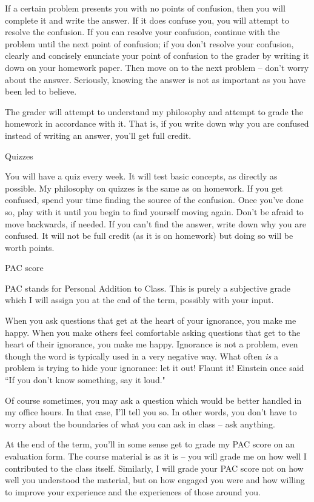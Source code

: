 \documentclass[12pt]{letter}
\begin{document}
If a certain problem presents you with no points of confusion, then you 
will complete it and write the answer.  If it does confuse you, you will 
attempt to resolve the confusion.  If you can resolve your confusion, 
continue with the problem until the next point of confusion; if you don't 
resolve your confusion, clearly and concisely enunciate your point of 
confusion to the grader by writing it down on your homework paper.  Then 
move on to the next problem -- don't worry about the answer.  Seriously, 
knowing the answer is not as important as you have been led to believe.

The grader will attempt to understand my philosophy and attempt to grade 
the homework in accordance with it.  That is, if you write down why you 
are confused instead of writing an answer, you'll get full credit.

\large Quizzes\normalsize 

You will have a quiz every week.  It will test basic concepts, as directly 
as possible.  My philosophy on quizzes is the same as on homework.  If you 
get confused, spend your time finding the source of the confusion.  Once 
you've done so, play with it until you begin to find yourself moving 
again.  Don't be afraid to move backwards, if needed.  If you can't find 
the answer, write down why you are confused.  It will not be full credit 
(as it is on homework) but doing so will be worth points.

\large PAC score\normalsize 

PAC stands for Personal Addition to Class.  This is purely a subjective 
grade which I will assign you at the end of the term, possibly with your 
input.

When you ask questions that get at the heart of your ignorance, you make 
me happy.  When you make others feel comfortable asking questions that get 
to the heart of their ignorance, you make me happy.  Ignorance is not a 
problem, even though the word is typically used in a very negative way.  
What often {\em is} a problem is trying to hide your ignorance: let it 
out!  Flaunt it!  Einstein once said ``If you don't know something, say it 
loud."

Of course sometimes, you may ask a question which would be better handled 
in my office hours.  In that case, I'll tell you so.  In other words, you 
don't have to worry about the boundaries of what you can ask in class -- 
ask anything.

At the end of the term, you'll in some sense get to grade my PAC score on 
an evaluation form.  The course material is as it is -- you will grade me 
on how well I contributed to the class itself.  Similarly, I will grade 
your PAC score not on how well you understood the material, but on how 
engaged you were and how willing to improve your experience and the 
experiences of those around you.
\end{document}
